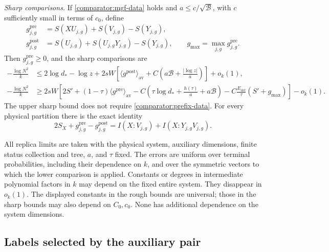 \begin{proposition}
\emph{Sharp comparisons.} If \eqref{comparator:mgf-data} holds and
$a\le c/\sqrt{\mathcal B}$, with $c$ sufficiently small in terms of
$c_0$, define
\begin{align*}
 g_{j,g}^{\mathrm{pre}}
   &=S(XU_{j,g})+S(V_{j,g})-S(Y_{j,g}),\\
 g_{j,g}^{\mathrm{post}}
   &=S(U_{j,g})+S(U_{j,g}Y_{j,g})-S(Y_{j,g}),
 \qquad g_{\max}=\max_{j,g}g_{j,g}^{\mathrm{pre}}.
\end{align*}
Then $g_{j,g}^{\mathrm{pre}}\ge0$, and the sharp comparisons are
\begin{align}
 -\frac{\log N^2}{k}
 &\le 2\log d_*-\log z+
  2sW\left[\langle g^{\mathrm{post}}\rangle_{\mathrm{av}}
          +C\left(a\mathcal B+\frac{|\log z|}{a}\right)\right]
          +o_k(1),
 \label{comparator:sharp-upper}\\
 -\frac{\log N^2}{k}
 &\ge 2sW\left[2S'+(1-\tau)
                  \langle g^{\mathrm{pre}}\rangle_{\mathrm{av}}
       -C\left(\tau\log d_*+\frac{h(\tau)}a+a\mathcal B\right)
       -C\frac{E_{\mathrm{def}}}{\tau}(S'+g_{\max})\right]
       -o_k(1).
 \label{comparator:sharp-lower}
\end{align}
The upper sharp bound does not require \eqref{comparator:prefix-data}.
For every physical partition there is the exact identity
\begin{equation}
 2S_X+g_{j,g}^{\mathrm{pre}}-g_{j,g}^{\mathrm{post}}
       =I(X:V_{j,g})+I(X:Y_{j,g}V_{j,g}).
 \label{comparator:entropy-identity}
\end{equation}

All replica limits are taken with the physical system, auxiliary dimensions,
finite status collection and tree, $a$, and $\tau$ fixed.  The errors are
uniform over terminal probabilities, including their dependence on $k$,
and over the symmetric vectors to which the lower comparison is applied.
Constants or degrees in intermediate polynomial factors in $k$ may depend
on the fixed entire system.  They disappear in $o_k(1)$.  The displayed
constants in the rough bounds are universal; those in the sharp bounds
may also depend on $C_0,c_0$.  None has additional dependence on the
system dimensions.
\end{proposition}

\subsection{Labels selected by the auxiliary pair}

